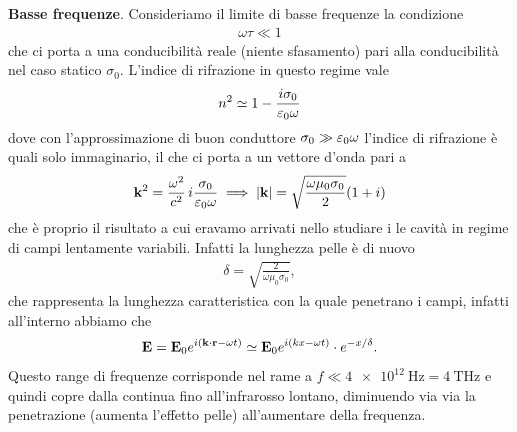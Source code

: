 \textbf{Basse frequenze}. Consideriamo il limite di basse frequenze la condizione 
\begin{align}
  \omega \tau \ll 1
\end{align}
che ci porta a una conducibilità reale (niente sfasamento) pari alla conducibilità nel caso statico $ \sigma_0 $. L'indice di rifrazione in questo 
regime vale 
\begin{align}
  n^2 \simeq 1 - \frac{i \sigma_0}{\varepsilon_0 \omega} 
\end{align}
dove con l'approssimazione di buon conduttore $ \sigma_0 \gg \varepsilon_0 \omega $ l'indice di rifrazione è quali solo immaginario, il che ci porta a un vettore 
d'onda pari a 
\begin{align}
  \mathbf{k}^2 = \frac{\omega^2}{c^2} \, i \frac{\sigma_0}{\varepsilon_0 \omega} \implies |\mathbf{k}| = \sqrt{\frac{\omega \mu_0 \sigma_0}{2}} (1 + i)
\end{align}
che è proprio il risultato a cui eravamo arrivati nello studiare i le cavità in regime di campi lentamente variabili. Infatti la lunghezza pelle è di nuovo 
\begin{align}
  \delta = \sqrt{\frac{2}{\omega \mu_0 \sigma_0}}, 
\end{align}
che rappresenta la lunghezza caratteristica con la quale penetrano i campi, infatti all'interno abbiamo che 
\begin{align}
  \mathbf{E} = \mathbf{E}_0 e^{i (\mathbf{k \cdot r} - \omega t)} \simeq \mathbf{E}_0 e^{i (k x - \omega t)} \cdot e^{-x/\delta}.
\end{align}
Questo range di frequenze corrisponde nel rame a $ f \ll \SI{4e12}{\Hz} = \SI{4}{\THz} $ e quindi copre dalla continua fino all'infrarosso lontano, 
diminuendo via via la penetrazione (aumenta l'effetto pelle) all'aumentare della frequenza.

